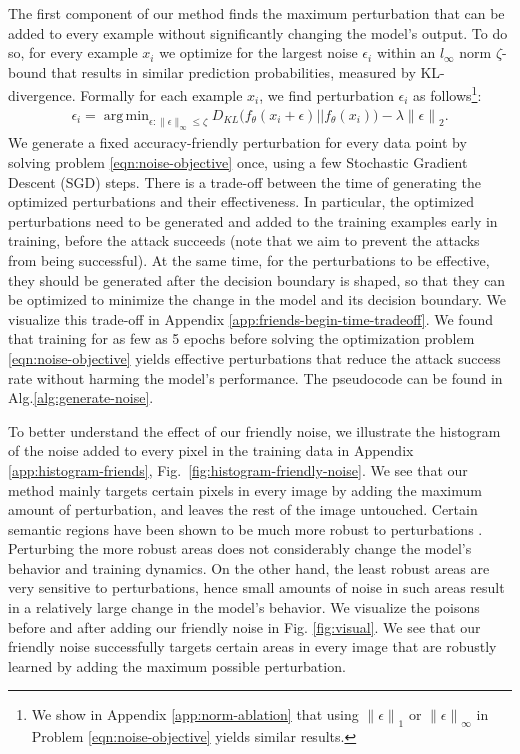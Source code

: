 \documentclass{article}
\DeclareMathOperator*{\argmin}{arg\,min}
\newcommand{\figref}[1]{Fig.~\ref{#1}}
\begin{document}
The first component of our method finds the maximum perturbation that can be added to every example without significantly changing the model's output.
To do so, for every example $x_i$ we optimize for the largest noise $\epsilon_i$ within an $l_\infty$ norm $\zeta$-bound that results in similar prediction probabilities, measured by KL-divergence.
Formally for each example $x_i$, we find perturbation $\epsilon_i$ as follows\footnote{We show in Appendix \ref{app:norm-ablation} that using ${\|\epsilon\|}_1$ or ${\|\epsilon\|}_\infty$ in Problem \eqref{eqn:noise-objective} yields similar results.}:
\begin{align}
\label{eqn:noise-objective}
    \epsilon_i = \argmin_{\epsilon:\|\epsilon\|_\infty\leq\zeta} {D_{KL}\big(f_\theta(x_i+\epsilon) || f_\theta(x_i)\big)} - \lambda {\|\epsilon\|}_2. %
\end{align}
We generate a fixed accuracy-friendly perturbation for every data point by solving problem \eqref{eqn:noise-objective} once, using a few Stochastic Gradient Descent (SGD) steps.
There is a trade-off between the time of generating the optimized perturbations and their effectiveness. %
In particular, the optimized perturbations need to be generated and added to the training examples early in training, before %
the attack succeeds (note that we aim to prevent the attacks from being successful). 
At the same time, 
for the perturbations to be effective, they should be generated after the decision boundary is shaped, so that they can be optimized to minimize the change in the model and its decision boundary. {We visualize this trade-off in Appendix \ref{app:friends-begin-time-tradeoff}}. 
We found that training for as few as 5 epochs before solving the optimization problem \eqref{eqn:noise-objective} yields effective perturbations that reduce the attack success rate without harming the model's performance.
The pseudocode can be found in Alg.\ref{alg:generate-noise}.

To better understand the effect of our friendly noise, we illustrate the histogram of the noise added to every pixel in the training data in Appendix \ref{app:histogram-friends},
\figref{fig:histogram-friendly-noise}.
We see that our method mainly targets certain pixels in every image by adding the maximum amount of perturbation, and leaves the rest of the image untouched. 
Certain semantic regions have been shown to be much more robust to perturbations \citep{berger2021stereoscopic}. 
Perturbing the more robust areas does not considerably change the model's behavior and training dynamics. On the other hand, the least robust areas are very sensitive to perturbations, hence small amounts of noise in such areas result in a relatively large change in the model's behavior. %
We visualize the poisons before and after adding our friendly noise in Fig. \ref{fig:visual}. 
We see that our friendly noise successfully targets certain areas in every image that are robustly learned by adding the maximum possible perturbation. 
\end{document}
